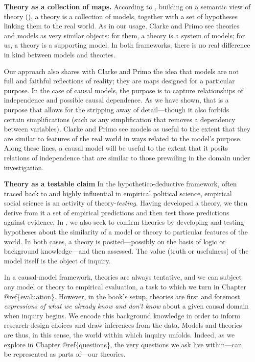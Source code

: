 \documentclass[12pt,]{book}
\begin{document}
\textbf{Theory as a collection of maps.} According to \citet{clarke2012model}, building on a semantic view of theory (\citet{giere2010explaining}), a theory is a collection of models, together with a set of hypotheses linking them to the real world. As in our usage, Clarke and Primo see theories and models as very similar objects: for them, a theory is a system of models; for us, a theory is a supporting model. In both frameworks, there is no real difference in kind between models and theories.

Our approach also shares with Clarke and Primo the idea that models are not full and faithful reflections of reality; they are maps designed for a particular purpose. In the case of causal models, the purpose is to capture relationships of independence and possible causal dependence. As we have shown, that is a purpose that allows for the stripping away of detail---though it also forbids certain simplifications (such as any simplification that removes a dependency between variables). Clarke and Primo see models as useful to the extent that they are similar to features of the real world in ways related to the model's purpose. Along these lines, a causal model will be useful to the extent that it posits relations of independence that are similar to those prevailing in the domain under investigation.

\textbf{Theory as a testable claim} In the hypothetico-deductive framework, often traced back to \citet{popper2014conjectures} and highly influential in empirical political science, empirical social science is an activity of theory-\emph{testing}. Having developed a theory, we then derive from it a set of empirical predictions and then test those predictions against evidence. In \citet{clarke2012model}, we also seek to confirm theories by developing and testing hypotheses about the similarity of a model or theory to particular features of the world. In both cases, a theory is posited---possibly on the basis of logic or background knowledge---and then assessed. The value (truth or usefulness) of the model itself is the object of inquiry.

In a causal-model framework, theories are always tentative, and we can subject any model or theory to empirical evaluation, a task to which we turn in Chapter @ref\{evaluation\}. However, in the book's setup, theories are first and foremost \emph{expressions of what we already know and don't know} about a given causal domain when inquiry begins. We encode this background knowledge in order to inform research-design choices and draw inferences from the data. Models and theories are thus, in this sense, the world within which inquiry unfolds. Indeed, as we explore in Chapter @ref\{questions\}, the very questions we ask live within---can be represented as parts of---our theories.
\end{document}
